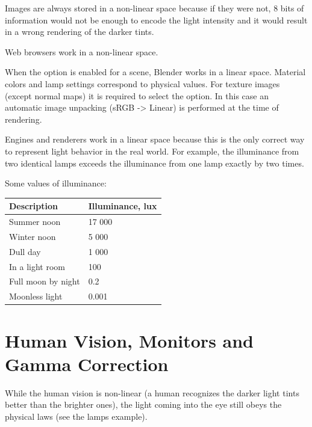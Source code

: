 \documentclass[a4paper,12pt,oneside]{sphinxmanual}
\begin{document}
\begin{DUlineblock}{0em}
\item[] 
\end{DUlineblock}

Images are always stored in a non-linear space because if they were not, 8 bits of information would not be enough to encode the light intensity and it would result in a wrong rendering of the darker tints.

Web browsers work in a non-linear space.

When the  option is enabled for a scene, Blender works in a linear space. Material colors and lamp settings correspond to physical values. For texture images (except normal maps) it is required to select the  option. In this case an automatic image unpacking (sRGB -\textgreater{} Linear) is performed at the time of rendering.

Engines and renderers work in a linear space because this is the only correct way to represent light behavior in the real world. For example, the illuminance from two identical lamps exceeds the illuminance from one lamp exactly by two times.

Some values of illuminance:

\begin{tabulary}{\linewidth}{|L|L|}
\hline
\textsf{\relax 
Description
} & \textsf{\relax 
Illuminance, lux
}\\
\hline
Summer noon
 & 
17 000
\\

Winter noon
 & 
5 000
\\

Dull day
 & 
1 000
\\

In a light room
 & 
100
\\

Full moon by night
 & 
0.2
\\

Moonless light
 & 
0.001
\\
\hline\end{tabulary}



\section{Human Vision, Monitors and Gamma Correction}
\label{gamma_alpha:id3}
While the human vision is non-linear (a human recognizes the darker light tints better than the brighter ones), the light coming into the eye still obeys the physical laws (see the lamps example).
\end{document}
